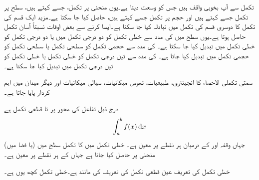 تکمل سے آپ بخوبی واقف ہیں جس کو  وسعت دیتا ہے۔یوں منحنی پر تکمل، جسے  کہتے ہیں، سطح پر تکمل جسے  کہتے ہیں اور حجم پر تکمل جسے  کہتے ہیں،  حاصل کیا جا سکتا ہے۔مزید ایک قسم کی تکمل کا دوسری قسم کی تکمل میں تبادلہ کیا جا سکتا ہے۔ایسا کرنے سے بعض اوقات نسبتاً آسان تکمل حاصل ہوتا ہے۔یوں سطح میں   کی مدد سے خطی تکمل کو دو درجی تکمل میں یا دو درجی تکمل کو خطی تکمل میں تبدیل کیا جا سکتا ہے۔  کی مدد سے حجمی تکمل کو سطحی تکمل یا سطحی تکمل کو حجمی تکمل میں تبدیل کیا جاتا ہے۔ کی مدد سے تین درجی تکمل کو خطی تکمل یا خطی تکمل کو تین درجی تکمل میں تبدیل کیا جا سکتا ہے۔

سمتی تکملی الاحصاء کا انجینئری، طبیعیات، ٹھوس میکانیات، سیالی میکانیات اور دیگر میدان میں اہم کردار پایا جاتا ہے۔

 درج ذیل  تفاعل  کی  محور پر  تا  قطعی تکمل ہے
\begin{align}\label{مساوات_سمتی_تکمل_قطعی}
\int_a^b f(x)\dif x
\end{align}
جہاں وقفہ  اور  کے درمیان  ہر نقطے پر  معین ہے۔ خطی تکمل میں  کا تکمل سطح میں (یا فضا میں) منحنی  پر حاصل کیا جاتا ہے جہاں  کے ہر نقطے پر  معین ہے۔

خطی تکمل کی تعریف عین قطعی تکمل کی تعریف کی مانند ہے۔خطی تکمل کچھ یوں ہے۔

